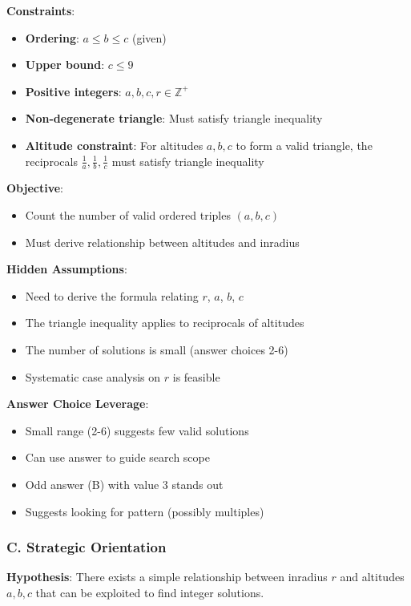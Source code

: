 \documentclass[12pt]{article}
\begin{document}
\begin{problemconfigbox}
\textbf{Constraints}:
\begin{itemize}
    \item \textbf{Ordering}: $a \leq b \leq c$ (given)
    \item \textbf{Upper bound}: $c \leq 9$
    \item \textbf{Positive integers}: $a, b, c, r \in \mathbb{Z}^+$
    \item \textbf{Non-degenerate triangle}: Must satisfy triangle inequality
    \item \textbf{Altitude constraint}: For altitudes $a, b, c$ to form a valid triangle, the reciprocals $\frac{1}{a}, \frac{1}{b}, \frac{1}{c}$ must satisfy triangle inequality
\end{itemize}

\textbf{Objective}:
\begin{itemize}
    \item Count the number of valid ordered triples $(a, b, c)$
    \item Must derive relationship between altitudes and inradius
\end{itemize}

\textbf{Hidden Assumptions}:
\begin{itemize}
    \item Need to derive the formula relating $r$, $a$, $b$, $c$
    \item The triangle inequality applies to reciprocals of altitudes
    \item The number of solutions is small (answer choices 2-6)
    \item Systematic case analysis on $r$ is feasible
\end{itemize}

\textbf{Answer Choice Leverage}:
\begin{itemize}
    \item Small range (2-6) suggests few valid solutions
    \item Can use answer to guide search scope
    \item Odd answer (B) with value 3 stands out
    \item Suggests looking for pattern (possibly multiples)
\end{itemize}

\subsubsection*{C. Strategic Orientation}

\textbf{Hypothesis}: There exists a simple relationship between inradius $r$ and altitudes $a, b, c$ that can be exploited to find integer solutions.


\end{problemconfigbox}
\end{document}
